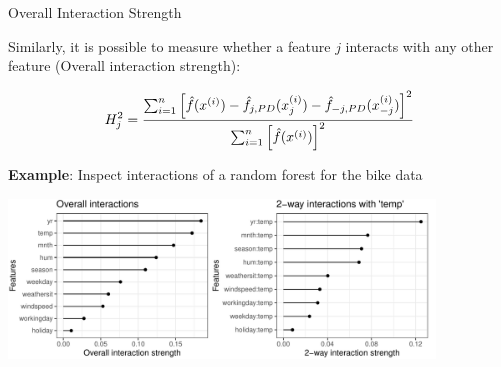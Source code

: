 \documentclass[11pt,compress,t,notes=noshow, xcolor=table]{beamer}
\begin{document}
\begin{vbframe}{Overall Interaction Strength}

Similarly, it is possible to measure whether a feature $j$ interacts with any other feature (Overall interaction strength):


$$H^2_{j} = \frac{\sum_{i=1}^n\left[\fh(x^{(i)}) - \fh_{j, PD}(x_j^{(i)}) - \fh_{-j, PD}(x_{-j}^{(i)})  \right]^2}{\sum_{i=1}^n \left[\fh(x^{(i)}) \right]^2}$$

\textbf{Example}: Inspect interactions of a random forest for the bike data

\begin{center}
	\includegraphics[width=0.85\textwidth]{figure_man/h-statistic}
\end{center}
\end{vbframe}


\endlecture
\end{document}
